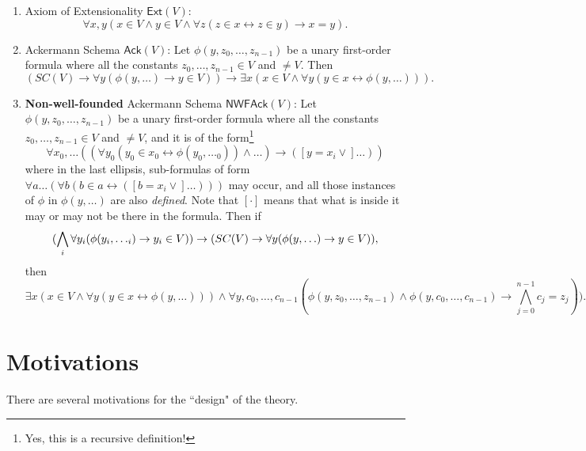 \documentclass{article}
\begin{document}
\begin{enumerate}
	\item Axiom of Extensionality $\textsf{Ext}(V)$: $$\forall x, y (x \in V \wedge y \in V \wedge \forall z(z\in x \leftrightarrow z \in y) \rightarrow x = y).$$
	\item Ackermann Schema $\textsf{Ack}(V)$: Let $\phi(y, z_0, \ldots, z_{n-1})$ be a unary first-order formula where all the constants $z_0, \ldots, z_{n-1} \in V$ and $\ne V$. Then $$(SC(V) \rightarrow \forall y(\phi(y, \ldots) \rightarrow y \in V)) \rightarrow \exists x(x \in V \wedge \forall y(y \in x \leftrightarrow \phi(y, \ldots))).$$
    \item \textbf{Non-well-founded} Ackermann Schema $\textsf{NWFAck}(V)$: Let $\phi(y, z_0, \ldots, z_{n-1})$ be a unary first-order formula where all the constants $z_0, \ldots, z_{n-1} \in V$ and $\ne V$, and it is of the form\footnote{Yes, this is a recursive definition!}
$$\forall x_0, \ldots ((\forall y_0(y_0 \in x_0 \leftrightarrow \phi(y_0, \ldots_0)) \wedge \ldots) \rightarrow ([y = x_i \vee] \ldots))$$
where in the last ellipsis, sub-formulas of form $\forall a \ldots (\forall b (b \in a \leftrightarrow ([b = x_i \vee] \ldots)))$ may occur, and all those instances of $\phi$ in $\phi(y, \ldots)$ are also \textit{defined}. Note that $[\cdot]$ means that what is inside it may or may not be there in the formula. Then if 
$$(\bigwedge_i \forall y_i( \phi(y_i, \ldots_i) \rightarrow y_i \in V)) \rightarrow \\ (SC(V) \rightarrow \forall y(\phi(y, \ldots) \rightarrow y \in V)),$$
then
$$\exists x(x \in V \wedge \forall y(y \in x \leftrightarrow \phi(y, \ldots))) \wedge \forall y, c_0, \ldots, c_{n-1} (\phi(y, z_0, \ldots, z_{n-1}) \wedge \phi(y, c_0, \ldots, c_{n-1}) \rightarrow \bigwedge_{j=0}^{n-1} {c_j = z_j})).$$
\end{enumerate}

\section{Motivations}
There are several motivations for the ``design" of the theory.\\
\end{document}
